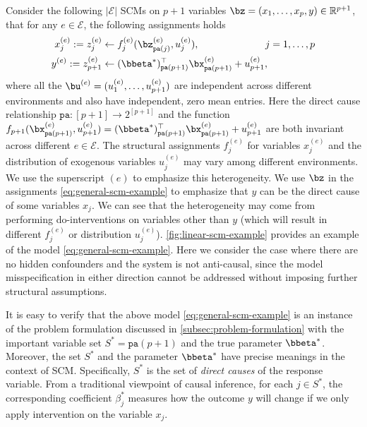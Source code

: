 \documentclass[10pt]{article}
\numberwithin{equation}{section}
\begin{document}
{Consider the following $|\mathcal{E}|$ SCMs on $p+1$ variables $\bz = (x_1,\ldots, x_p, y) \in \mathbb{R}^{p+1}$, that for any $e\in \mathcal{E}$, the following assignments holds
\begin{align}
\label{eq:general-scm-example}
\begin{split}
x^{(e)}_j := z_j^{(e)} &\gets {f^{(e)}_j}(\bz^{(e)}_{{\mathtt{pa}(j)}}, {u_{j}^{(e)}}), ~~~~~~~~~~~~~~~~~~~~ j = 1,\ldots, p\\
y^{(e)} := z_{p+1}^{(e)} &\gets ({\bbeta^*})^\top_{{\mathtt{pa}(p+1)}} \bx^{(e)}_{{\mathtt{pa}(p+1)}} + {u_{p+1}^{(e)}},
\end{split}
\end{align} where all the $\bu^{(e)} = (u_1^{(e)}, \ldots, u_{p+1}^{(e)})$ are independent across different environments and also have independent, zero mean entries. Here the direct cause relationship $\mathtt{pa}: [p+1] \to 2^{[p+1]}$ and the function $f_{p+1}(\bx^{(e)}_{\mathtt{pa}(p+1)}, u_{p+1}^{(e)})=({\bbeta^*})^\top_{{\mathtt{pa}(p+1)}} \bx^{(e)}_{{\mathtt{pa}(p+1)}} + {u_{p+1}^{(e)}}$ are both invariant across different $e\in \mathcal{E}$. The structural assignments $f^{(e)}_j$ for variables $x_j^{(e)}$ and the distribution of exogenous variables $u_j^{(e)}$ may vary among different environments. We use the superscript $(e)$ to emphasize this heterogeneity. We use $\bz$ in the assignments \eqref{eq:general-scm-example} to emphasize that $y$ can be the direct cause of some variables $x_j$. We can see that the heterogeneity may come from performing do-interventions on variables other than $y$ (which will result in different $f_j^{(e)}$ or distribution $u_j^{(e)}$). \cref{fig:linear-scm-example} provides an example of the model \eqref{eq:general-scm-example}.  Here we consider the case where there are no hidden confounders and the system is not anti-causal, since the model misspecification in either direction cannot be addressed without imposing further structural assumptions. 

It is easy to verify that the above model \eqref{eq:general-scm-example} is an instance of the problem formulation discussed in  \cref{subsec:problem-formulation} with the important variable set $S^*=\mathtt{pa}(p+1)$ and the true parameter $\bbeta^*$. Moreover, the set $S^*$ and the parameter $\bbeta^*$ have precise meanings in the context of SCM. Specifically, $S^*$ is the set of \emph{direct causes} of the response variable. From a traditional viewpoint of causal inference, for each $j\in S^*$, the corresponding coefficient $\beta_j^*$ measures how the outcome $y$ will change if we only apply intervention on the variable $x_j$.  

}
\end{document}
